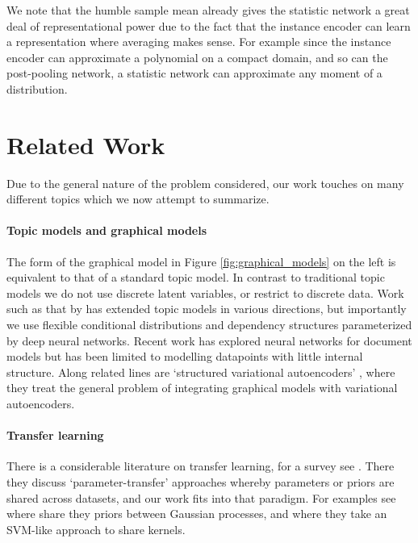 \documentclass{article} %
\begin{document}
We note that the humble sample mean already gives the statistic network a great deal of representational power due to the fact that the instance encoder can learn a representation where averaging makes sense. For example since the instance encoder can approximate a polynomial on a compact domain, and so can the post-pooling network, a statistic network can approximate any moment of a distribution.
\vspace{-1em}
\section{Related Work}
Due to the general nature of the problem considered, our work touches on many different topics which we now attempt to summarize.
\vspace{-0.5em}
\paragraph{Topic models and graphical models} The form of the graphical model in Figure \ref{fig:graphical_models} on the left is equivalent to that of a standard topic model. In contrast to traditional topic models we do not use discrete latent variables, or restrict to discrete data. Work such as that by \cite{topic_model} has extended topic models in various directions, but importantly we use flexible conditional distributions and dependency structures parameterized by deep neural networks. Recent work has explored neural networks for document models \citep[see e.g.][]{neural_variational_text} but has been limited to modelling datapoints with little internal structure. Along related lines are `structured variational autoencoders' \citep[see][]{structured_vae}, where they treat the general problem of integrating graphical models with variational autoencoders.

\paragraph{Transfer learning} There is a considerable literature on transfer learning, for a survey see \citet{transfer_survey}. There they discuss `parameter-transfer' approaches whereby parameters or priors are shared across datasets, and our work fits into that paradigm. For examples see \citet{informative_vector_machine} where share they priors between Gaussian processes, and \citet{multitask_svm} where they take an SVM-like approach to share kernels.
\end{document}
